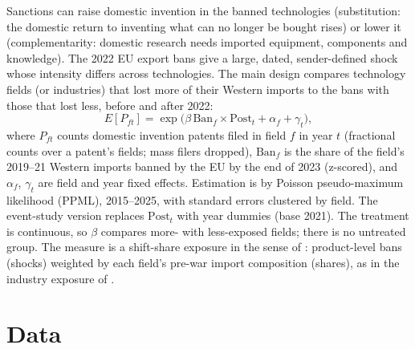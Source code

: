 \documentclass[11pt,a4paper]{article}
\begin{document}
Sanctions can raise domestic invention in the banned technologies (substitution: the domestic return to inventing
what can no longer be bought rises) or lower it (complementarity: domestic research needs imported equipment,
components and knowledge). The 2022 EU export bans give a large, dated, sender-defined shock whose intensity differs
across technologies. The main design compares technology fields (or industries) that lost more of their Western
imports to the bans with those that lost less, before and after 2022:
\begin{equation}
  E[P_{ft}] = \exp\!\big(\beta\,\mathrm{Ban}_f \times \mathrm{Post}_t + \alpha_f + \gamma_t\big),
  \label{eq:main}
\end{equation}
where $P_{ft}$ counts domestic invention patents filed in field $f$ in year $t$ (fractional counts over a patent's
fields; mass filers dropped), $\mathrm{Ban}_f$ is the share of the field's 2019--21 Western imports banned by the EU
by the end of 2023 (z-scored), and $\alpha_f$, $\gamma_t$ are field and year fixed effects. Estimation is by Poisson
pseudo-maximum likelihood (PPML), 2015--2025, with standard errors clustered by field. The event-study version
replaces $\mathrm{Post}_t$ with year dummies (base 2021). The treatment is continuous, so $\beta$ compares more- with
less-exposed fields; there is no untreated group. The measure is a shift-share exposure in the sense of
\citet{BorusyakHullJaravel2022}: product-level bans (shocks) weighted by each field's pre-war import composition
(shares), as in the industry exposure of \citet{EgorovEtAl2026}.

\section{Data}
\end{document}
